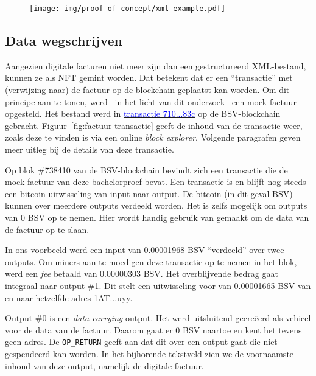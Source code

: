 \begin{figure}[H]
	\centering
	\texttt{[image: img/proof-of-concept/xml-example.pdf]}
\end{figure}


\subsection{Data wegschrijven}
\label{sub:data-wegschrijven}

Aangezien digitale facturen niet meer zijn dan een gestructureerd XML-bestand, kunnen ze als NFT gemint worden. Dat betekent dat er een ``transactie'' met (verwijzing naar) de factuur op de blockchain geplaatst kan worden. Om dit principe aan te tonen, werd --in het licht van dit onderzoek-- een mock-factuur opgesteld. Het bestand werd in \href{https://whatsonchain.com/tx/71054b6b9aef47124cc5db9983a06d7608ec408c1ed3ee3a0ad0e34e2951c83c}{\textcolor{blue}{transactie 710...83c}} op de BSV-blockchain gebracht. Figuur~\ref{fig:factuur-transactie} geeft de inhoud van de transactie weer, zoals deze te vinden is via een online \textit{block explorer}. Volgende paragrafen geven meer uitleg bij de details van deze transactie.

Op blok \#738410 van de BSV-blockchain bevindt zich een transactie die de mock-factuur van deze bachelorproef bevat. Een transactie is en blijft nog steeds een bitcoin-uitwisseling van input naar output. De bitcoin (in dit geval BSV) kunnen over meerdere outputs verdeeld worden. Het is zelfs mogelijk om outputs van 0 BSV op te nemen. Hier wordt handig gebruik van gemaakt om de data van de factuur op te slaan.

In ons voorbeeld werd een input van 0.00001968 BSV ``verdeeld'' over twee outputs. Om miners aan te moedigen deze transactie op te nemen in het blok, werd een \textit{fee} betaald van 0.00000303 BSV. Het overblijvende bedrag gaat integraal naar output \#1. Dit stelt een uitwisseling voor van 0.00001665 BSV van en naar hetzelfde adres 1AT...uyy.

Output \#0 is een \textit{data-carrying} output. Het werd uitsluitend gecreëerd als vehicel voor de data van de factuur. Daarom gaat er 0 BSV naartoe en kent het tevens geen adres. De \verb|OP_RETURN| geeft aan dat dit over een output gaat die niet gespendeerd kan worden. In het bijhorende tekstveld zien we de voornaamste inhoud van deze output, namelijk de digitale factuur.

